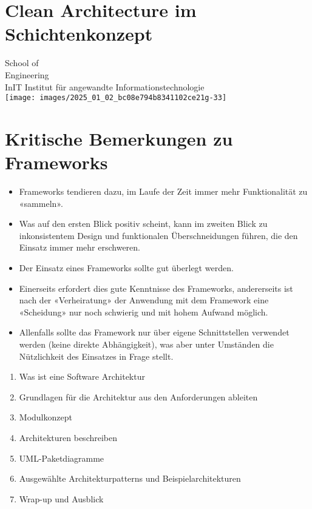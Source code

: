 \documentclass[10pt]{article}
\begin{document}
\section*{Clean Architecture im Schichtenkonzept}
School of\\
Engineering\\
InIT Institut für angewandte Informationstechnologie\\
\texttt{[image: images/2025\_01\_02\_bc08e794b8341102ce21g-33]}

\section*{Kritische Bemerkungen zu Frameworks}
\begin{itemize}
  \item Frameworks tendieren dazu, im Laufe der Zeit immer mehr Funktionalität zu «sammeln».
  \item Was auf den ersten Blick positiv scheint, kann im zweiten Blick zu inkonsistentem Design und funktionalen Überschneidungen führen, die den Einsatz immer mehr erschweren.
  \item Der Einsatz eines Frameworks sollte gut überlegt werden.
  \item Einerseits erfordert dies gute Kenntnisse des Frameworks, andererseits ist nach der «Verheiratung» der Anwendung mit dem Framework eine «Scheidung» nur noch schwierig und mit hohem Aufwand möglich.
  \item Allenfalls sollte das Framework nur über eigene Schnittstellen verwendet werden (keine direkte Abhängigkeit), was aber unter Umständen die Nützlichkeit des Einsatzes in Frage stellt.
\end{itemize}

\begin{enumerate}
  \item Was ist eine Software Architektur
  \item Grundlagen für die Architektur aus den Anforderungen ableiten
  \item Modulkonzept
  \item Architekturen beschreiben
  \item UML-Paketdiagramme
  \item Ausgewählte Architekturpatterns und Beispielarchitekturen
  \item Wrap-up und Ausblick
\end{enumerate}
\end{document}
